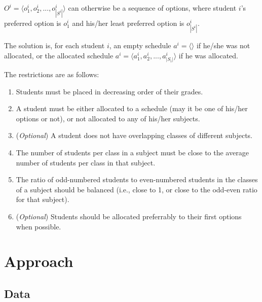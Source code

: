 \documentclass[runningheads]{llncs}
\begin{document}
$O^i = \langle o^i_1, o^i_2, ..., o^i_{|S^i|} \rangle$ can otherwise be a sequence of options, where student $i$'s preferred option is $o^i_1$ and his/her least preferred option is $o^i_ {|S^i|}$.

The solution is, for each student $i$, an empty schedule $a^i=\langle \rangle$ if he/she was not allocated, or the allocated schedule $a^i = \langle a^i_1, a^i_2, ..., a^i_{|S_i|} \rangle$ if he was allocated.

The restrictions are as follows:
\begin{enumerate}
    \item Students must be placed in decreasing order of their grades.
    \item A student must be either allocated to a schedule (may it be one of his/her options or not), or not allocated to any of his/her subjects.
    \item (\textit{Optional}) A student does not have overlapping classes of different subjects.
    \item The number of students per class in a subject must be close to the average number of students per class in that subject.
    \item The ratio of odd-numbered students to even-numbered students in the classes of a subject should be balanced (i.e., close to 1, or close to the odd-even ratio for that subject).
    \item (\textit{Optional}) Students should be allocated preferrably to their first options when possible.
\end{enumerate}

\newpage

\section{Approach}

\subsection{Data}
\end{document}
